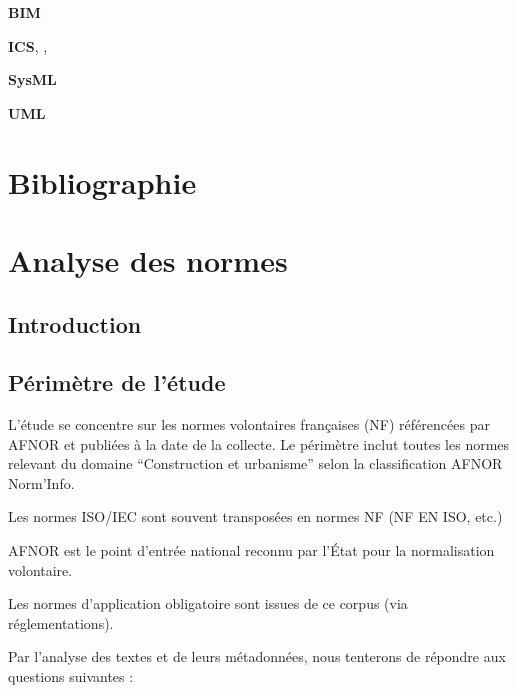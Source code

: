 \documentclass[a4paper,12pt]{article}
\begin{document}
\textbf{\hypertarget{gls-70}{BIM}}\hspace*{1em}\hspace*{.5em}\pageref{gls-1-use-1}

\textbf{\hypertarget{gls-184}{ICS}}\hspace*{1em}\hspace*{.5em}\pageref{gls-5-use-1}, \pageref{gls-5-use-2}, \pageref{gls-5-use-3}

\textbf{\hypertarget{gls-329}{SysML}}\hspace*{1em}\hspace*{.5em}\pageref{gls-3-use-1}

\textbf{\hypertarget{gls-336}{UML}}\hspace*{1em}\hspace*{.5em}\pageref{gls-2-use-1}

\clearpage
\section{Bibliographie}
\label{sec:org3184189}
\small
\printbibliography[heading=none]

\normalsize
\clearpage

\appendix
\section{Analyse des normes}
\label{sec:orgd32a055}
\subsection{Introduction}
\label{sec:org56d56b0}
\subsection{Périmètre de l'étude}
\label{sec:orgda76581}
L’étude se concentre sur les normes volontaires françaises (NF) référencées par AFNOR et publiées à la date de la collecte.
Le périmètre inclut toutes les normes relevant du domaine “Construction et urbanisme” selon la classification AFNOR Norm’Info.

Les normes ISO/IEC sont souvent transposées en normes NF (NF EN ISO, etc.)

AFNOR est le point d’entrée national reconnu par l’État pour la normalisation volontaire.

Les normes d’application obligatoire sont issues de ce corpus (via réglementations).

Par l'analyse des textes et de leurs métadonnées, nous tenterons de répondre aux questions suivantes :
\end{document}
